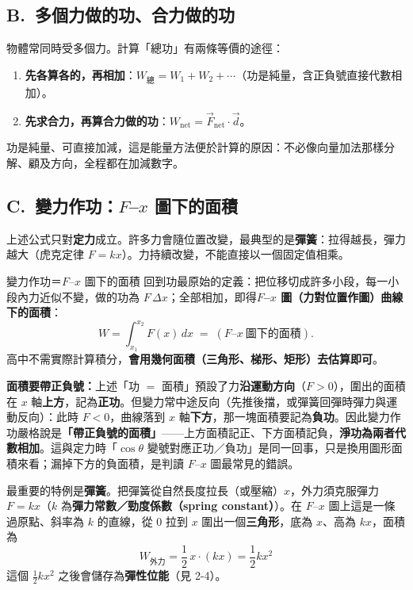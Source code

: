 \documentclass[11pt]{article}
\begin{document}
\subsection*{\sffamily B.\ 多個力做的功、合力做的功}

物體常同時受多個力。計算「總功」有兩條等價的途徑：
\begin{enumerate}\setlength{\itemsep}{1pt}
\item \textbf{先各算各的，再相加}：$W_{\text{總}}=W_1+W_2+\cdots$（功是純量，含正負號直接代數相加）。
\item \textbf{先求合力，再算合力做的功}：$W_{\text{net}}=\vec F_{\text{net}}\cdot\vec d$。
\end{enumerate}
功是純量、可直接加減，這是能量方法便於計算的原因：不必像向量加法那樣分解、顧及方向，全程都在加減數字。

\subsection*{\sffamily C.\ 變力作功：$F$–$x$ 圖下的面積}

上述公式只對\textbf{定力}成立。許多力會隨位置改變，最典型的是\textbf{彈簧}：拉得越長，彈力越大（虎克定律 $F=kx$）。力持續改變，不能直接以一個固定值相乘。

\begin{補充框}{變力作功＝$F$–$x$ 圖下的面積}
回到功最原始的定義：把位移切成許多小段，每一小段內力近似不變，做的功為 $F\,\Delta x$；全部相加，即得\textbf{$F$–$x$ 圖（力對位置作圖）曲線下的面積}：
$$W=\int_{x_1}^{x_2}F(x)\,dx \;=\; (F\text{–}x\ \text{圖下的面積}).$$
高中不需實際計算積分，\textbf{會用幾何面積（三角形、梯形、矩形）去估算即可}。

\textbf{面積要帶正負號：}上述「功 $=$ 面積」預設了力\textbf{沿運動方向}（$F>0$），圍出的面積在 $x$ 軸\textbf{上方}，記為\textbf{正功}。但變力常中途反向（先推後擋，或彈簧回彈時彈力與運動反向）：此時 $F<0$，曲線落到 $x$ 軸\textbf{下方}，那一塊面積要記為\textbf{負功}。因此變力作功嚴格說是\textbf{「帶正負號的面積」}——上方面積記正、下方面積記負，\textbf{淨功為兩者代數相加}。這與定力時「$\cos\theta$ 變號對應正功／負功」是同一回事，只是換用圖形面積來看；漏掉下方的負面積，是判讀 $F$–$x$ 圖最常見的錯誤。

最重要的特例是\textbf{彈簧}。把彈簧從自然長度拉長（或壓縮）$x$，外力須克服彈力 $F=kx$（$k$ 為\textbf{彈力常數／勁度係數（spring constant）}）。在 $F$–$x$ 圖上這是一條過原點、斜率為 $k$ 的直線，從 $0$ 拉到 $x$ 圍出一個\textbf{三角形}，底為 $x$、高為 $kx$，面積為
$$\boxed{\;W_{\text{外力}}=\frac{1}{2}\,x\cdot(kx)=\frac{1}{2}kx^2\;}$$
這個 $\tfrac12kx^2$ 之後會儲存為\textbf{彈性位能}（見 2-4）。
\end{補充框}
\end{document}
